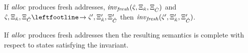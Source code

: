 \begin{lemma}
  If $\mathit{alloc}$ produces fresh addresses, $\mathit{inv}_{\mathit{fresh}}(\hat\varsigma,\Xi_{\hat{\kappa}},\Xi_{\hat{C}})$ and
$\mastate,\mktab_{\makont},\mktab_{\mamkont} \stepto
\mastate',\mktab'_{\makont},\mktab'_{\mamkont}$ then
$\mathit{inv}_{\mathit{fresh}}(\hat\varsigma',\Xi'_{{\hat{\kappa}}},\Xi'_{{\hat{C}}})$.
\end{lemma}
\begin{theorem}
  If $\mathit{alloc}$ produces fresh addresses then the resulting semantics is complete with respect to states satisfying the invariant.
\end{theorem}
